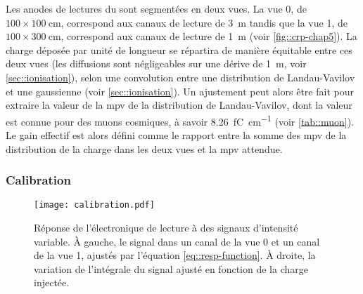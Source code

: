       Les anodes de lectures du \TOO sont segmentées en deux vues. La vue 0, de $100\times\SI{100}{\centi\meter}$, correspond aux canaux de lecture de \SI{3}{\meter} tandis que la vue 1, de $100\times\SI{300}{\centi\meter}$, correspond aux canaux de lecture de \SI{1}{\meter} (voir \autoref{fig::crp-chap5}). La charge déposée par unité de longueur se répartira de manière équitable entre ces deux vues (les diffusions sont négligeables sur une dérive de \SI{1}{\meter}, voir \autoref{sec::ionisation}), selon une convolution entre une distribution de Landau-Vavilov et une gaussienne (voir \autoref{sec::ionisation}). Un ajustement peut alors être fait pour extraire la valeur de la \gls{mpv} de la distribution de Landau-Vavilov, dont la valeur est connue pour des muons cosmiques, à savoir \SI{8.26}{\femto\coulomb\per\centi\meter} (voir \autoref{tab::muon}). Le gain effectif est alors défini comme le rapport entre la somme des \gls{mpv} de la distribution de la charge dans les deux vues et la \gls{mpv} attendue.

      \subsubsection{Calibration}

        \begin{figure}[htbp]
          \centering
          \texttt{[image: calibration.pdf]}
          \caption[Réponse de l'électronique de lecture.]{\label{fig::cali-311}Réponse de l'électronique de lecture à des signaux d'intensité variable. À gauche, le signal dans un canal de la vue 0 et un canal de la vue 1, ajustés par l'équation \eqref{eq::resp-function}. À droite, la variation de l'intégrale du signal ajusté en fonction de la charge injectée.}
        \end{figure}

